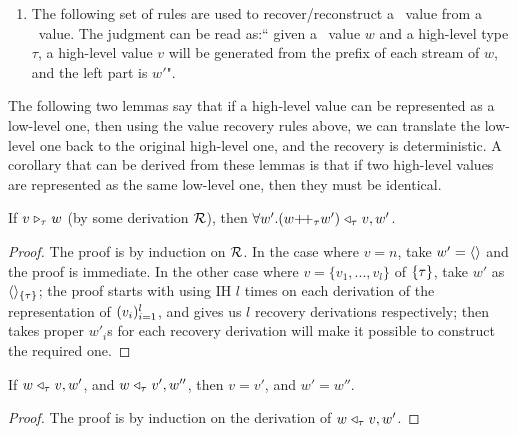 \begin{enumerate}[(1)]
	


\item The following set of rules are used to recover/reconstruct a \fmsnesl \ value from a \fmsvcode\ value. The judgment can be read as:`` given a \fmsvcode\ value $w$ and a high-level type $\tau$, a high-level value $v$ will be generated from the prefix of each stream of $w$, and the left part is $w'$". \\

\end{enumerate}


The following two lemmas say that if a high-level value can be represented as a low-level one, then using the value recovery rules above, we can translate the low-level one back to the original high-level one, and the recovery is deterministic.
A corollary that can be derived from these lemmas is that if two high-level values are represented as the same low-level one, then they must be identical.

\begin{lem}
	If $v \mathrel{\triangleright_{\tau}} w$ (by some derivation $\mathcal{R}$), then $\forall w'.\Vtransb{(w {\++}_{\tau} w')}{\tau}{v}{w'}$. 
\end{lem}
\begin{proof}
	The proof is by induction on $\mathcal{R}$. In the case where $v = n$, take $w' = \langle \rangle$ and the proof is immediate.
	In the other case where $v = \{v_1,...,v_l\}$ of $\{\tau\}$, take $w'$ as $\langle \rangle_{\{\tau\}}$; 
	the proof starts with using IH $l$ times on each derivation of the representation of $(v_i)^l_{i=1}$, and gives us $l$ recovery derivations respectively; then takes proper $w'_i$s for each recovery derivation will make it possible to construct the required one.
\end{proof}

\begin{lem}
	If $w \mathrel{\triangleleft_{\tau}} v,w'$, and $w \mathrel{\triangleleft_{\tau}} v',w''$,
	then $v = v'$, and $w' = w'' $.
\end{lem}
\begin{proof}
	The proof is by induction on the derivation of $w \mathrel{\triangleleft_{\tau}} v,w'$.
\end{proof}

